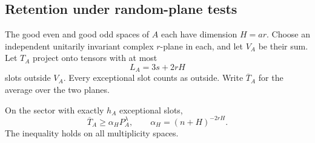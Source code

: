 \subsection{Retention under random-plane tests}
\label{ten:lowplanes:part:243}

The good even and good odd spaces of \(A\) each have dimension \(H=ar\).
Choose an independent unitarily invariant complex \(r\)-plane in each,
and let \(V_A\) be their sum.  Let \(T_A\) project onto tensors with at
most
\[
 L_A=3s+2rH
\]
slots outside \(V_A\).  Every exceptional slot counts as outside.
Write \(\overline T_A\) for the average over the two planes.

\begin{lemma}\label{lem:plane-retention}
On the sector with exactly \(h_A\) exceptional slots,
\begin{equation}
 \overline T_A\ge\alpha_H P_A^\lambda,
 \qquad \alpha_H=(n+H)^{-2rH}.
 \label{ten:lowplanes:eq:19}
\end{equation}
The inequality holds on all multiplicity spaces.
\end{lemma}

